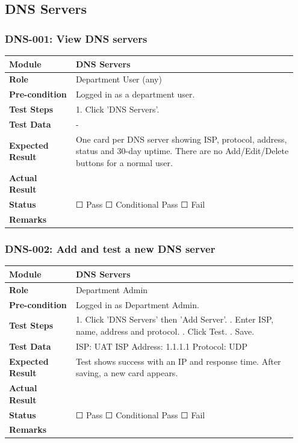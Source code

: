 \documentclass[10pt]{article}
\begin{document}
\subsection{DNS Servers}
\subsubsection*{DNS-001: View DNS servers}
\begin{longtable}{p{0.22\linewidth}p{0.73\linewidth}}
\hline
\textbf{Module} & DNS Servers \\ \hline
\textbf{Role} & Department User (any) \\ \hline
\textbf{Pre-condition} & Logged in as a department user. \\ \hline
\textbf{Test Steps} & 1. Click 'DNS Servers'. \\ \hline
\textbf{Test Data} & - \\ \hline
\textbf{Expected Result} & One card per DNS server showing ISP, protocol, address, status and 30-day uptime. There are no Add/Edit/Delete buttons for a normal user. \\ \hline
\textbf{Actual Result} & \newline \newline \\ \hline
\textbf{Status} & ☐ Pass \quad ☐ Conditional Pass \quad ☐ Fail \\ \hline
\textbf{Remarks} & \newline \\ \hline
\end{longtable}
\subsubsection*{DNS-002: Add and test a new DNS server}
\begin{longtable}{p{0.22\linewidth}p{0.73\linewidth}}
\hline
\textbf{Module} & DNS Servers \\ \hline
\textbf{Role} & Department Admin \\ \hline
\textbf{Pre-condition} & Logged in as Department Admin. \\ \hline
\textbf{Test Steps} & 1. Click 'DNS Servers' then 'Add Server'. \newline 2. Enter ISP, name, address and protocol. \newline 3. Click Test. \newline 4. Save. \\ \hline
\textbf{Test Data} & ISP: UAT ISP \newline Address: 1.1.1.1 \newline Protocol: UDP \\ \hline
\textbf{Expected Result} & Test shows success with an IP and response time. After saving, a new card appears. \\ \hline
\textbf{Actual Result} & \newline \newline \\ \hline
\textbf{Status} & ☐ Pass \quad ☐ Conditional Pass \quad ☐ Fail \\ \hline
\textbf{Remarks} & \newline \\ \hline
\end{longtable}
\end{document}
